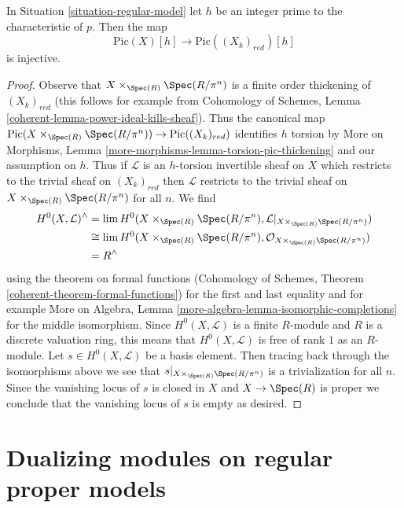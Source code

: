 \begin{lemma}
\label{lemma-torsion-embeds}
In Situation \ref{situation-regular-model} let $h$ be an integer
prime to the characteristic of $p$. Then the map
$$
\text{Pic}(X)[h] \longrightarrow \text{Pic}((X_k)_{red})[h]
$$
is injective.
\end{lemma}

\begin{proof}
Observe that $X \times_{\Spec(R)} \Spec(R/\pi^n)$ is a finite
order thickening of $(X_k)_{red}$ (this follows for example from
Cohomology of Schemes, Lemma \ref{coherent-lemma-power-ideal-kills-sheaf}).
Thus the canonical map
$\text{Pic}(X \times_{\Spec(R)} \Spec(R/\pi^n)) \to \text{Pic}((X_k)_{red})$
identifies $h$ torsion by
More on Morphisms, Lemma \ref{more-morphisms-lemma-torsion-pic-thickening}
and our assumption on $h$.
Thus if $\mathcal{L}$ is an $h$-torsion invertible sheaf on $X$
which restricts to the trivial sheaf on $(X_k)_{red}$ then
$\mathcal{L}$ restricts to the trivial sheaf on
$X \times_{\Spec(R)} \Spec(R/\pi^n)$ for all $n$.
We find
\begin{align*}
H^0(X, \mathcal{L})^\wedge
& =
\lim H^0(X \times_{\Spec(R)} \Spec(R/\pi^n),
\mathcal{L}|_{X \times_{\Spec(R)} \Spec(R/\pi^n)}) \\
& \cong
\lim H^0(X \times_{\Spec(R)} \Spec(R/\pi^n),
\mathcal{O}_{X \times_{\Spec(R)} \Spec(R/\pi^n)}) \\
& =
R^\wedge
\end{align*}
using the theorem on formal functions
(Cohomology of Schemes, Theorem \ref{coherent-theorem-formal-functions})
for the first and last equality and for example
More on Algebra, Lemma \ref{more-algebra-lemma-isomorphic-completions}
for the middle isomorphism. Since $H^0(X, \mathcal{L})$ is a finite
$R$-module and $R$ is a discrete valuation ring, this means that
$H^0(X, \mathcal{L})$ is free of rank $1$ as an $R$-module.
Let $s \in H^0(X, \mathcal{L})$ be a basis element.
Then tracing back through the isomorphisms above we see
that $s|_{X \times_{\Spec(R)} \Spec(R/\pi^n)}$ is a trivialization
for all $n$. Since the vanishing locus of $s$ is closed in $X$
and $X \to \Spec(R)$ is proper we conclude that the vanishing
locus of $s$ is empty as desired.
\end{proof}






\section{Dualizing modules on regular proper models}
\label{section-dualizing}

